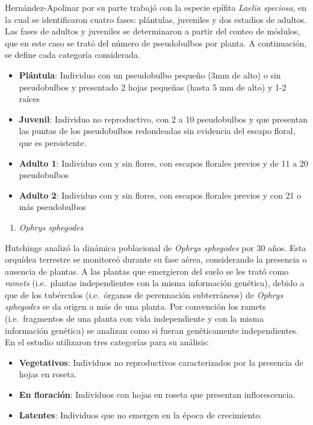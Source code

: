 \documentclass[
]{book}
\providecommand{\tightlist}{%
  \setlength{\itemsep}{0pt}\setlength{\parskip}{0pt}}
\theoremstyle{definition}
\theoremstyle{definition}
\theoremstyle{definition}
\theoremstyle{definition}
\theoremstyle{remark}
\begin{document}
Hernández-Apolinar \citep{hernandez1992dinamica} por su parte trabajó con la especie epífita \emph{Laelia speciosa}, en la cual se identificaron cuatro fases: plántulas, juveniles y dos estadios de adultos.
Las fases de adultos y juveniles se determinaron a partir del conteo de módulos, que en este caso se trató del número de pseudobulbos por planta.
A continuación, se define cada categoría considerada.

\begin{itemize}
\tightlist
\item
  \textbf{Plántula}: Individuo con un pseudobulbo pequeño (3mm de alto) o sin pseudobulbos y presentado 2 hojas pequeñas (hasta 5 mm de alto) y 1-2 raíces
\item
  \textbf{Juvenil}: Individuo no reproductivo, con 2 a 10 pseudobulbos y que presentan las puntas de los pseudobulbos redondeadas sin evidencia del escapo floral, que es persistente.
\item
  \textbf{Adulto 1}: Individuo con y sin flores, con escapos florales previos y de 11 a 20 pseudobulbos
\item
  \textbf{Adulto 2}: Individuo con y sin flores, con escapos florales previos y con 21 o más pseudobulbos
\end{itemize}

\begin{enumerate}
\def\labelenumi{\alph{enumi})}
\setcounter{enumi}{4}
\tightlist
\item
  \emph{Ophrys sphegodes}
\end{enumerate}

Hutchings \citep{hutchings2010population} analizó la dinámica poblacional de \emph{Ophrys sphegodes} por 30 años.
Esta orquídea terrestre se monitoreó durante su fase aérea, considerando la presencia o ausencia de plantas.
A las plantas que emergieron del suelo se les trató como \emph{ramets} (i.e.~plantas independientes con la misma información genética), debido a que de los tubérculos (i.e.~órganos de perennación subterráneos) de \emph{Ophrys sphegodes} se da origen a más de una planta.
Por convención los ramets (i.e.~fragmentos de una planta con vida independiente y con la misma información genética) se analizan como si fueran genéticamente independientes.
En el estudio utilizaron tres categorías para su análisis:

\begin{itemize}
\tightlist
\item
  \textbf{Vegetativos}: Individuos no reproductivos caracterizados por la presencia de hojas en roseta.
\item
  \textbf{En floración}: Individuos con hojas en roseta que presentan inflorescencia.
\item
  \textbf{Latentes}: Individuos que no emergen en la época de crecimiento.
\end{itemize}
\end{document}
